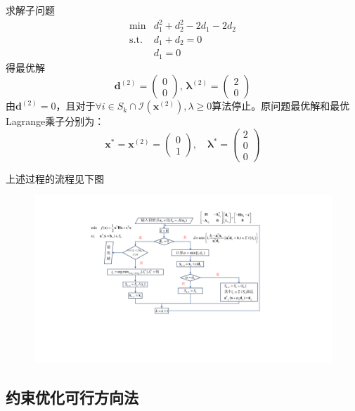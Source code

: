 \begin{example}
\begin{solution}
        求解子问题
        \[
            \begin{array}{rl}
                \operatorname*{min}&d_{1}^{2}+d_{2}^{2}-2d_{1}-2d_{2}\\
                \mathrm{s.t.}&d_{1}+d_2=0\\
                &d_1 = 0
            \end{array}
        \]
        得最优解
        \[
            \boldsymbol{d}^{(2)}=\begin{pmatrix}0\\0\end{pmatrix},\,\boldsymbol{\lambda}^{(2)}=\begin{pmatrix}2\\0\end{pmatrix}
        \] 
        由$\boldsymbol{d}^{(2)}=0$，且对于$\forall i\in S_{k}\cap \mathcal{I}(\boldsymbol{x}^{(2)}),\lambda\geqslant 0$算法停止。原问题最优解和最优Lagrange乘子分别为：
        \[
            \boldsymbol{x}^*=\boldsymbol{x}^{(2)}=\begin{pmatrix}0\\1\end{pmatrix},\quad 
            \boldsymbol{\lambda}^* = \begin{pmatrix}
                2\\0\\0
            \end{pmatrix}
        \]
    \end{solution}
\end{example}
上述过程的流程见下图
\begin{figure}[htbp]
    \centering
    \includegraphics[width = .8\textwidth]{image/active_set-flow.pdf}
\end{figure}

\subsection{约束优化可行方向法}
